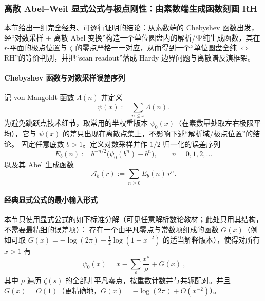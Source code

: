 \subsubsection{离散 Abel--Weil 显式公式与极点刚性：由素数端生成函数刻画 RH}\label{subsec:discrete-abel-weil-polar-rigidity}
本节给出一组完全经典、可逐行证明的结论：从素数端的 Chebyshev 函数出发，经“对数采样 + 离散 Abel 变换”构造一个单位圆盘内的解析/亚纯生成函数，其在 \(r\)-平面的极点位置与 \(\zeta\) 的零点严格一一对应，从而得到一个“单位圆盘全纯 \(\Leftrightarrow\) RH”的等价判别，并把“scan readout”落成 Hardy 边界问题与离散谱反演框架。

\paragraph{Chebyshev 函数与对数采样误差序列}
记 von Mangoldt 函数 \(\Lambda(n)\) 并定义
\[
\psi(x):=\sum_{n\le x}\Lambda(n).
\]
为避免跳跃点技术细节，取常用的半权重版本 \(\psi_0(x)\)（在素数幂处取左右极限平均），它与 \(\psi(x)\) 的差只出现在离散点集上，不影响下述“解析域/极点位置”的结论。
固定任意底数 \(b>1\)。定义对数采样并作 \(1/2\) 归一化的误差序列
\[
\boxed{\ E_b(n):=b^{-n/2}\bigl(\psi_0(b^n)-b^n\bigr),\qquad n=0,1,2,\dots\ }
\]
以及其 Abel 生成函数
\[
\boxed{\ \mathcal A_b(r):=\sum_{n\ge 0}E_b(n)\,r^n.\ }
\]

\paragraph{经典显式公式的最小输入形式}
本节只使用显式公式的如下标准分解（可见任意解析数论教材；此处只用其结构，不需要最精细的误差项）：
存在一个由平凡零点与常数项组成的函数 \(G(x)\)（例如可取 \(G(x)=-\log(2\pi)-\tfrac12\log(1-x^{-2})\) 的适当解释版本），使得对所有 \(x>1\) 有
\begin{equation}\label{eq:psi0-explicit-schematic}
\boxed{\ \psi_0(x)=x-\sum_{\rho}\frac{x^\rho}{\rho}+G(x)\ },
\end{equation}
其中 \(\rho\) 遍历 \(\zeta(s)\) 的全部非平凡零点，按重数计数并与共轭配对。并且 \(G(x)=O(1)\)（更精确地，\(G(x)=-\log(2\pi)+O(x^{-2})\)）。

